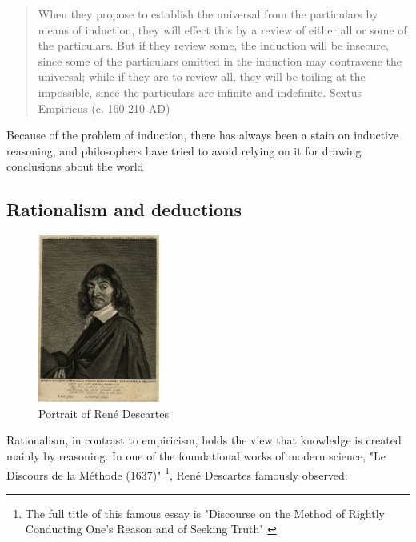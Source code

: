 \documentclass{tufte-book}
\begin{document}
\begin{quote}
When they propose to establish the universal from the particulars by means of induction, they will effect this by a review of either all or some of the particulars. But if they review some, the induction will be insecure, since some of the particulars omitted in the induction may contravene the universal; while if they are to review all, they will be toiling at the impossible, since the particulars are infinite and indefinite. Sextus Empiricus (c. 160-210 AD)
\end{quote}

Because of the problem of induction, there has always been a stain on inductive reasoning, and philosophers have tried to avoid relying on it for drawing conclusions about the world


\subsection{Rationalism and deductions}

\begin{figure}[]
\begin{center}
\includegraphics[width = 4cm]{figures/Descartes}
\caption{Portrait of René Descartes}
\label{fig: Descartes}
\end{center}
\end{figure}


Rationalism, in contrast to empiricism, holds the view that knowledge is created mainly by reasoning. In one of the foundational works of modern science, "Le Discours de la Méthode (1637)"  \footnote{The full title of this famous essay is "Discourse on the Method of Rightly Conducting One's Reason and of Seeking Truth" \citep{Descartes-DiscourseMethodRightly-1673}}, René Descartes famously observed: 
\end{document}
